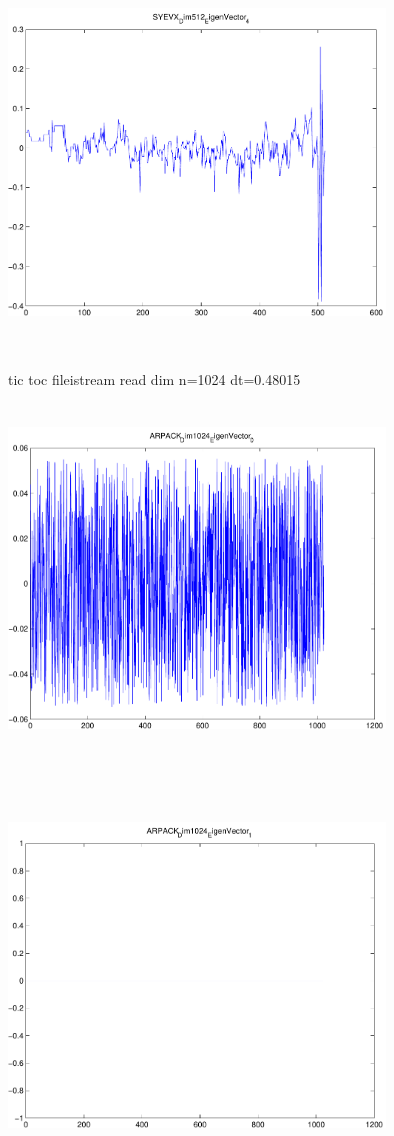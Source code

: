 \documentclass[9pt]{article}
\theoremstyle{plain}
\theoremstyle{definition}
\theoremstyle{remark}
\numberwithin{equation}{section}
\begin{document}
\includegraphics[width=10.0cm,height=10.0cm]{SYEVX_Dim512_EigenVector_4.pdf}

tic toc fileistream read dim n=1024 dt=0.48015
\includegraphics[width=10.0cm,height=10.0cm]{ARPACK_Dim1024_EigenVector_0.pdf}

\includegraphics[width=10.0cm,height=10.0cm]{ARPACK_Dim1024_EigenVector_1.pdf}
\end{document}
